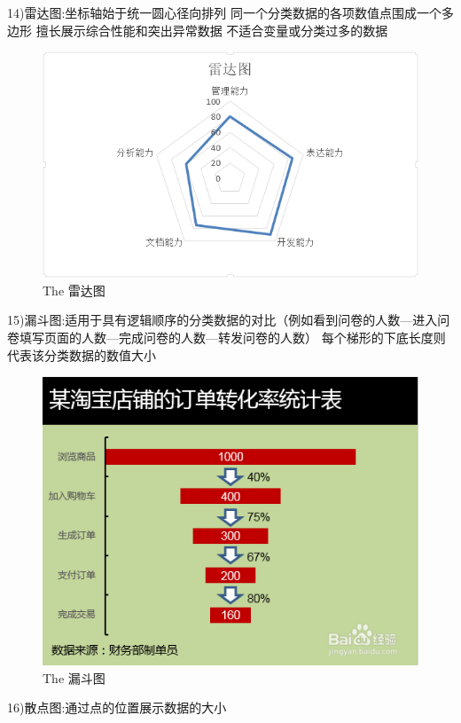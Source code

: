 \documentclass{article}
\begin{document}
\begin{itemize}
    		14)雷达图:坐标轴始于统一圆心径向排列
    		同一个分类数据的各项数值点围成一个多边形
    		擅长展示综合性能和突出异常数据
    		不适合变量或分类过多的数据\par
    		\begin{figure}[h!]
    			\centering
    			\includegraphics[scale=0.6]{leida}
    			\caption{The 雷达图}
    			\label{fig:leida}
    		\end{figure}
    		15)漏斗图:适用于具有逻辑顺序的分类数据的对比（例如看到问卷的人数—进入问卷填写页面的人数—完成问卷的人数—转发问卷的人数）
    		每个梯形的下底长度则代表该分类数据的数值大小\par
    		\begin{figure}[h!]
    			\centering
    			\includegraphics[scale=0.7]{loudou}
    			\caption{The 漏斗图}
    			\label{fig:loudou}
    		\end{figure}
    		16)散点图:通过点的位置展示数据的大小

\end{itemize}
\end{document}
